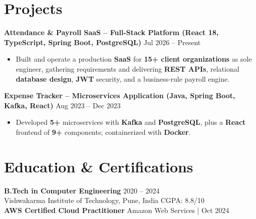 \documentclass[a4paper,10pt]{article}
\begin{document}
\section*{Projects}

\textbf{Attendance \& Payroll SaaS -- Full-Stack Platform (React 18, TypeScript, Spring Boot, PostgreSQL)} \hfill Jul 2026 -- Present
\begin{itemize}[leftmargin=*]
    \item Built and operate a production \textbf{SaaS} for \textbf{15+ client organizations} as sole engineer, gathering requirements and delivering \textbf{REST APIs}, relational \textbf{database design}, \textbf{JWT} security, and a business-rule payroll engine.
\end{itemize}

\textbf{Expense Tracker -- Microservices Application (Java, Spring Boot, Kafka, React)} \hfill Aug 2023 -- Dec 2023
\begin{itemize}[leftmargin=*]
    \item Developed \textbf{5+} microservices with \textbf{Kafka} and \textbf{PostgreSQL}, plus a \textbf{React} frontend of \textbf{9+} components; containerized with \textbf{Docker}.
\end{itemize}

\section*{Education \& Certifications}
\textbf{B.Tech in Computer Engineering} \hfill 2020 -- 2024 \\
Vishwakarma Institute of Technology, Pune, India \hfill CGPA: 8.8/10 \\
\textbf{AWS Certified Cloud Practitioner} \hfill Amazon Web Services \;|\; Oct 2024
\end{document}
